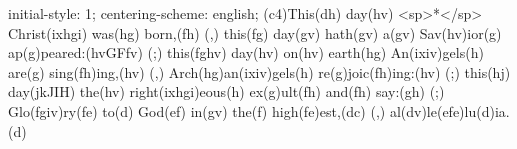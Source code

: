 initial-style: 1;
centering-scheme: english;
(c4)This(dh) day(hv) <sp>*</sp> Christ(ixhgi) was(hg) born,(fh) (,) this(fg) day(gv) hath(gv) a(gv) Sav(hv)ior(g) ap(g)peared:(hvGFfv) (;) this(fghv) day(hv) on(hv) earth(hg) An(ixiv)gels(h) are(g) sing(fh)ing,(hv) (,) Arch(hg)an(ixiv)gels(h) re(g)joic(fh)ing:(hv) (;) this(hj) day(jkJIH) the(hv) right(ixhgi)eous(h) ex(g)ult(fh) and(fh) say:(gh) (;) Glo(fgiv)ry(fe) to(d) God(ef) in(gv) the(f) high(fe)est,(dc) (,) al(dv)le(efe)lu(d)ia.(d)
